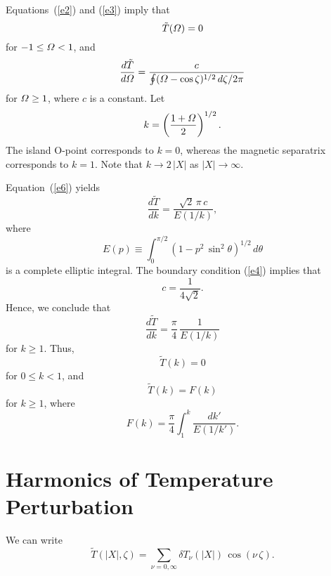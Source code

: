 \documentclass[12pt,prb,aps,notitlepage]{revtex4-1}
\begin{document}
Equations~(\ref{e2}) and (\ref{e3})
imply that
\begin{equation}
\tilde{T}({\mit\Omega}) = 0
\end{equation}
for $-1\leq {\mit\Omega}<1$, and
\begin{equation}\label{e6}
\frac{d\tilde{T}}{d{\mit\Omega}} = \frac{c}{\oint({\mit\Omega}-\cos\zeta)^{1/2}\,d\zeta/2\pi}
\end{equation}
for ${\mit\Omega}\geq 1$, where $c$ is a constant. 
Let
\begin{equation}
k = \left(\frac{1+{\mit\Omega}}{2}\right)^{1/2}.
\end{equation}
The island O-point corresponds to $k=0$, whereas the magnetic separatrix corresponds to $k=1$. Note that $k\rightarrow 2\,|X|$ as $|X| \rightarrow\infty$. 

Equation~(\ref{e6}) yields
\begin{equation}
\frac{d\tilde{T}}{dk} = \frac{\sqrt{2}\,\pi\,c}{E(1/k)},
\end{equation}
where
\begin{equation}
E(p) \equiv \int_0^{\pi/2}(1-p^2\,\sin^2\theta)^{1/2}\,d\theta
\end{equation}
is a complete elliptic integral. 
The boundary condition (\ref{e4}) implies that
\begin{equation}
c = \frac{1}{4\sqrt{2}}.
\end{equation}
Hence, we conclude that
\begin{equation}
\frac{d\tilde{T}}{dk} =\frac{\pi}{4}\,\frac{1}{E(1/k)}
\end{equation}
for $k\geq 1$. 
Thus, 
\begin{equation}
\tilde{T}(k)= 0
\end{equation}
for $0\leq k< 1$, and
\begin{equation}
\tilde{T}(k)=F(k)
\end{equation}
for $k\geq 1$,
where
\begin{equation}
F(k) =\frac{\pi}{4}\int_1^k \frac{dk'}{E(1/k')}.
\end{equation}

\section{Harmonics of Temperature Perturbation}
We can write
\begin{equation}
\tilde{T}(|X|,\zeta) = \sum_{\nu=0,\infty}\delta T_\nu(|X|)\,\cos(\nu\,\zeta).
\end{equation}
\end{document}
